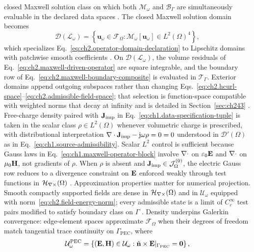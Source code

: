 closed Maxwell solution class on which both $\mathcal{M}_\omega$ and
$\mathcal{B}_\Gamma$ are simultaneously evaluable in the declared data spaces
\cite{harrington2001}. The closed Maxwell solution domain becomes
\begin{equation}
\label{eq:ch2.domain-refinement-L}
\mathcal{D}(\mathcal{L}_\omega)
=
\left\{
\mathbf{u}_\omega\in\mathcal{F}_\Omega:
\mathcal{M}_\omega[\mathbf{u}_\omega]\in L^{2}(\Omega)^{4}
\right\},
\end{equation}
which specializes Eq.~\eqref{eq:ch2.operator-domain-declaration} to Lipschitz
domains with patchwise smooth coefficients \cite{stratton1941}. On
\(\mathcal{D}(\mathcal{L}_\omega)\), the volume residuals of
Eq.~\eqref{eq:ch2.maxwell-driven-operator} are square integrable, and the boundary
row of Eq.~\eqref{eq:ch2.maxwell-boundary-composite} is evaluated in
\(\mathcal{T}_\Gamma\). Exterior domains append outgoing subspaces rather than
changing Eqs.~\eqref{eq:ch2.hcurl-space}--\eqref{eq:ch2.admissible-field-space};
that selection is function-space compatible with weighted norms that decay at
infinity and is detailed in Section~\ref{sec:ch243} \cite{harrington2001}.
Free-charge density paired with \(\mathbf{J}_{\mathrm{imp}}\) in
Eq.~\eqref{eq:ch1.data-specification-tuple} is taken in the scalar class
\(\rho\in L^{2}(\Omega)\) whenever volumetric charge is prescribed, with
distributional interpretation \(\nabla\cdot\mathbf{J}_{\mathrm{imp}}-\mathrm{j}\omega\rho=0=0\) understood in
\(\mathcal{D}'(\Omega)\) as in Eq.~\eqref{eq:ch1.source-admissibility}. Scalar
\(L^{2}\) control is sufficient because Gauss laws in
Eq.~\eqref{eq:ch1.maxwell-operator-block} involve \(\nabla\cdot\) on \(\varepsilon_0\mathbf{E}\)
and \(\nabla\cdot\) on \(\mu_0\mathbf{H}\), not gradients of \(\rho\). When \(\rho\) is absent and
\(\mathbf{J}_{\mathrm{imp}}\in\mathcal{J}_\Omega^{(0)}\), the electric Gauss row reduces to a
divergence constraint on \(\mathbf{E}\) enforced weakly through test functions in
\(\mathcal{H}_{\nabla\times}(\Omega)\) \cite{stratton1941}. Approximation properties matter for numerical projection. Smooth compactly supported
fields are dense in \(\mathcal{H}_{\nabla\times}(\Omega)\) and in \(\mathcal{U}_\omega\) equipped with
norm~\eqref{eq:ch2.field-energy-norm}; every admissible state is a limit of
\(C_c^\infty\) test pairs modified to satisfy boundary class on \(\Gamma\)
\cite{stratton1941}. Density underpins Galerkin convergence: edge-element spaces
approximate \(\mathcal{F}_\Omega\) when their degrees of freedom match tangential
trace continuity on \(\Gamma_{\mathrm{PEC}}\), where
\begin{equation}
\label{eq:ch2.pec-subspace}
\mathcal{U}_\omega^{\mathrm{PEC}}
=
\left\{
(\mathbf{E},\mathbf{H})\in\mathcal{U}_\omega:
\hat{\mathbf{n}}\times\mathbf{E}|_{\Gamma_{\mathrm{PEC}}}=\mathbf{0}
\right\},
\end{equation}
